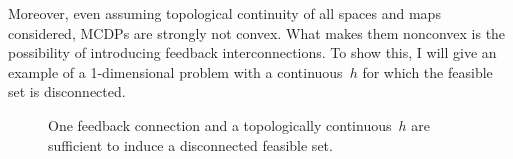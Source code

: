 \documentclass[twocolumn,english]{IEEEtran}
\theoremstyle{definition}
\theoremstyle{plain}
\theoremstyle{definition}
\theoremstyle{remark}
\theoremstyle{definition}
\theoremstyle{plain}
\theoremstyle{plain}
\newcommand{\ftor}{{h}}
\begin{document}
Moreover, even assuming topological continuity of all spaces and maps
considered, MCDPs are strongly not convex. What makes them nonconvex
is the possibility of introducing feedback interconnections. To show
this, I will give an example of a 1-dimensional problem with a continuous~$\ftor$
for which the feasible set is disconnected.

\begin{figure}[H]
\hfill{}\hfill{}\hfill{}

\caption{\label{fig:ceil-1}One feedback connection and a topologically continuous~$\ftor$
are sufficient to induce a disconnected feasible set.}
\end{figure}
\end{document}
